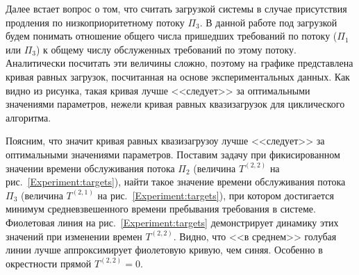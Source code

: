 \documentclass{report}
\begin{document}
Далее встает вопрос о том, что считать загрузкой системы в случае присутствия продления по низкоприоритетному потоку $\Pi_3$. В данной работе под загрузкой будем понимать отношение общего числа пришедших требований по потоку ($\Pi_1$ или $\Pi_3$) к общему числу обслуженных требований по этому потоку. Аналитически посчитать эти величины сложно, поэтому на графике представлена кривая равных загрузок, посчитанная на основе экспериментальных данных. Как видно из рисунка, такая кривая лучше <<следует>> за оптимальными значениями параметров, нежели кривая равных квазизагрузок для циклического алгоритма.

Поясним, что значит кривая равных квазизагрузоу лучше <<следует>> за оптимальными значениями параметров. Поставим задачу при фикисированном значении времени обслуживания потока $\Pi_2$ (величина $T^{(2,2)}$ на рис.~\ref{Experiment:targets}), найти такое значение времени обслуживания потока $\Pi_3$ (величина $T^{(2,1)}$ на рис.~\ref{Experiment:targets}), при котором достигается минимум средневзвешенного времени пребывания требования в системе. Фиолетовая линия на рис.~\ref{Experiment:targets} демонстрирует динамику этих значений при изменении времен $T^{(2,2)}$. Видно, что <<в среднем>> голубая линии лучше аппроксимирует фиолетовую кривую, чем синяя. Особенно в окрестности прямой $T^{(2,2)}=0$. 
\end{document}
